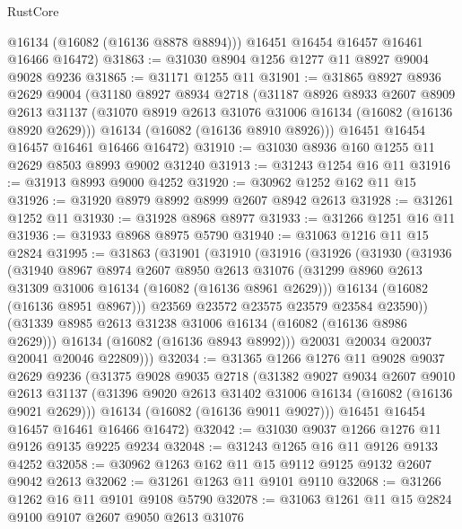 \begin{lexlean}{RustCore}
\begin{coremodule}
        @16134
        (@16082 (@16136 @8878 @8894)))
      @16451
      @16454
      @16457
      @16461
      @16466
      @16472)
@31863 := @31030 @8904 @1256 @1277 @11 @8927 @9004 @9028 @9236
@31865 := @31171 @1255 @11
@31901 := @31865
    @8927
    @8936
    @2629
    @9004
    (@31180
      @8927
      @8934
      @2718
      (@31187
        @8926
        @8933
        @2607
        @8909
        @2613
        @31137
        (@31070 @8919 @2613 @31076 @31006 @16134 (@16082 (@16136 @8920 @2629)))
        @16134
        (@16082 (@16136 @8910 @8926)))
      @16451
      @16454
      @16457
      @16461
      @16466
      @16472)
@31910 := @31030 @8936 @160 @1255 @11 @2629 @8503 @8993 @9002 @31240
@31913 := @31243 @1254 @16 @11
@31916 := @31913 @8993 @9000 @4252
@31920 := @30962 @1252 @162 @11 @15
@31926 := @31920 @8979 @8992 @8999 @2607 @8942 @2613
@31928 := @31261 @1252 @11
@31930 := @31928 @8968 @8977
@31933 := @31266 @1251 @16 @11
@31936 := @31933 @8968 @8975 @5790
@31940 := @31063 @1216 @11 @15 @2824
@31995 := @31863
    (@31901
      (@31910
        (@31916
          (@31926
            (@31930
              (@31936
                (@31940
                  @8967
                  @8974
                  @2607
                  @8950
                  @2613
                  @31076
                  (@31299 @8960 @2613 @31309 @31006 @16134 (@16082 (@16136 @8961 @2629)))
                  @16134
                  (@16082 (@16136 @8951 @8967)))
                @23569
                @23572
                @23575
                @23579
                @23584
                @23590))
            (@31339 @8985 @2613 @31238 @31006 @16134 (@16082 (@16136 @8986 @2629)))
            @16134
            (@16082 (@16136 @8943 @8992)))
          @20031
          @20034
          @20037
          @20041
          @20046
          @22809)))
@32034 := @31365
    @1266
    @1276
    @11
    @9028
    @9037
    @2629
    @9236
    (@31375
      @9028
      @9035
      @2718
      (@31382
        @9027
        @9034
        @2607
        @9010
        @2613
        @31137
        (@31396 @9020 @2613 @31402 @31006 @16134 (@16082 (@16136 @9021 @2629)))
        @16134
        (@16082 (@16136 @9011 @9027)))
      @16451
      @16454
      @16457
      @16461
      @16466
      @16472)
@32042 := @31030 @9037 @1266 @1276 @11 @9126 @9135 @9225 @9234
@32048 := @31243 @1265 @16 @11 @9126 @9133 @4252
@32058 := @30962 @1263 @162 @11 @15 @9112 @9125 @9132 @2607 @9042 @2613
@32062 := @31261 @1263 @11 @9101 @9110
@32068 := @31266 @1262 @16 @11 @9101 @9108 @5790
@32078 := @31063 @1261 @11 @15 @2824 @9100 @9107 @2607 @9050 @2613 @31076

\end{coremodule}
\end{lexlean}
